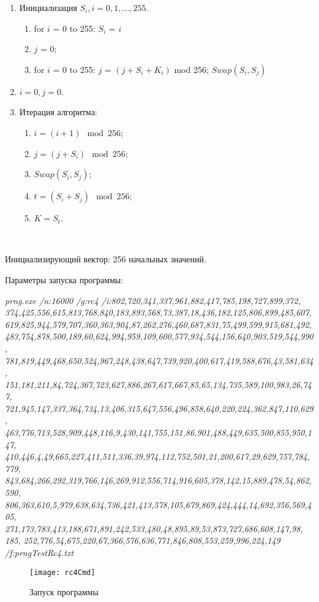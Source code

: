 \documentclass[bachelor, och, coursework]{shiza}
\begin{document}
	\begin{enumerate}
		\item Инициализация $S_i, i = 0,1, \dots ,255.$
		\begin{enumerate}
			\item  for $i$ = 0 to 255: $ S_i$ = $i $
			\item $ j$ = 0;
			\item  for $i$ = 0 to 255: $j$ = $(j + S_i + K_i)$ mod 256; $Swap(S_i, S_j) $
		\end{enumerate}
		\item $i = 0, j = 0$.
		\item Итерация алгоритма:
		\begin{enumerate}
			\item $i = (i + 1) \mod 256$;
			\item $j = (j + S_i) \mod 256$;
			\item $Swap(S_i, S_j)$;
			\item $t = (S_i + S_j) \mod 256$;
			\item $K = S_t$.
		\end{enumerate}
	\end{enumerate} \
	
	Инициализирующий вектор: 256 начальных значений.
	
	Параметры запуска программы:
	
	\textit{prng.exe /n:16000 /g:rc4 /i:802,720,341,337,961,882,417,785,198,727,899,372, 374,425,556,615,813,768,840,183,893,568,73,387,18,436,182,125,806,899,485,607, 619,825,944,579,707,360,363,904,87,262,276,460,687,831,75,499,599,915,681,492, 483,754,878,500,189,60,624,994,959,109,600,577,934,544,156,640,903,519,544,990, 781,819,449,468,650,524,967,248,438,647,739,920,400,617,419,588,676,43,581,634, 151,181,211,84,724,367,723,627,886,267,617,667,85,65,134,735,589,100,983,26,747, 721,945,147,337,364,734,13,406,315,647,556,496,858,640,220,224,362,847,110,629, 463,776,713,528,909,448,116,9,430,141,755,151,86,901,488,449,635,500,855,950,147, 410,446,4,49,665,227,411,511,336,39,974,112,752,501,21,200,617,29,629,757,784,779, 843,684,266,292,319,766,146,269,912,556,714,916,605,378,142,15,889,478,54,862,590, 806,363,610,5,979,638,634,736,421,413,578,105,679,869,424,444,14,692,356,569,405, 271,173,783,413,188,671,891,242,533,480,48,895,89,53,873,727,686,608,147,98, 185,} \textit{252,776,54,675,220,67,366,576,636,771,846,808,553,259,996,224,149 /f:prngTestRc4.txt}
	
	\begin{figure}[H]
		\centering
		\texttt{[image: rc4Cmd]}
		\caption{Запуск программы}
		\label{fig:rc4Cmd}
	\end{figure}
	
\end{document}
